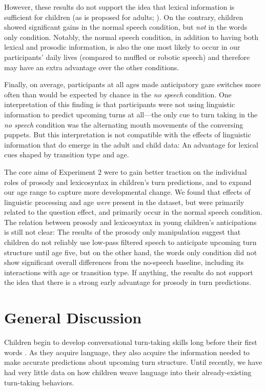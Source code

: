 \documentclass[authoryear, 12pt]{elsarticle}
\begin{document}
However, these results do not support the idea that lexical information is sufficient for children (as is proposed for adults; \citealp{de-ruiter2006}). On the contrary, children showed significant gains in the normal speech condition, but \textit{not} in the words only condition. Notably, the normal speech condition, in addition to having both lexical and prosodic information, is also the one most likely to occur in our participants' daily lives (compared to muffled or robotic speech) and therefore may have an extra advantage over the other conditions.

Finally, on average, participants at all ages made anticipatory gaze switches more often than would be expected by chance in the \textit{no speech} condition. One interpretation of this finding is that participants were not using linguistic information to predict upcoming turns at all---the only cue to turn taking in the \textit{no speech} condition was the alternating mouth movements of the conversing puppets. But this interpretation is not compatible with the effects of linguistic information that do emerge in the adult and child data: An advantage for lexical cues shaped by transition type and age.

The core aims of Experiment 2 were to gain better traction on the individual roles of prosody and lexicosyntax in children's turn predictions, and to expand our age range to capture more developmental change. We found that effects of linguistic processing and age \textit{were} present in the dataset, but were primarily related to the question effect, and primarily occur in the normal speech condition. The relation between prosody and lexicosyntax in young children's anticipations is still not clear: The results of the prosody only manipulation suggest that children do not reliably use low-pass filtered speech to anticipate upcoming turn structure until age five, but on the other hand, the words only condition did not show significant overall differences from the no-speech baseline, including its interactions with age or transition type. If anything, the results do not support the idea that there is a strong early advantage for prosody in turn predictions.

\section{General Discussion}
\label{sec:gendisc}

Children begin to develop conversational turn-taking skills long before their first words \citep{bateson1975, hilbrink2015, jaffe2001, snow1977}. As they acquire language, they also acquire the information needed to make accurate predictions about upcoming turn structure. Until recently, we have had very little data on how children weave language into their already-existing turn-taking behaviors. 
\end{document}
